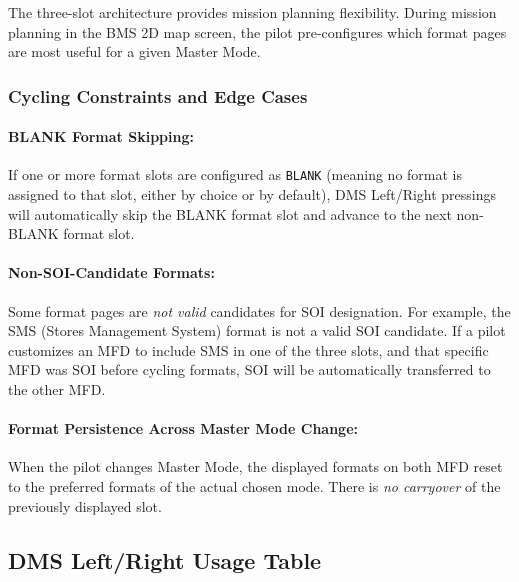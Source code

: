 \documentclass[11pt, a4paper, twoside]{report}
\begin{document}
The three-slot architecture provides mission planning flexibility. During mission planning in the BMS 2D map screen, the pilot pre-configures which format pages are most useful for a given Master Mode.
\subsubsection{Cycling Constraints and Edge Cases}
\label{sec:C3-S4-S2-S4}

\paragraph{BLANK Format Skipping:}

If one or more format slots are configured as \texttt{BLANK} (meaning no format is assigned to that slot, either by choice or by default), DMS Left/Right pressings will automatically skip the BLANK format slot and advance to the next non-BLANK format slot.

\paragraph{Non-SOI-Candidate Formats:}

Some format pages are \textit{not valid} candidates for SOI designation. For example, the SMS (Stores Management System) format is not a valid SOI candidate. If a pilot customizes an MFD to include SMS in one of the three slots, and that specific MFD was SOI before cycling formats, SOI will be automatically transferred to the other MFD.

\paragraph{Format Persistence Across Master Mode Change:}

When the pilot changes Master Mode, the displayed formats on both MFD reset to the preferred formats of the actual chosen mode. There is \textit{no carryover} of the previously displayed slot.


\subsection{DMS Left/Right Usage Table}
\label{sec:C3-S4-S3}
\end{document}
